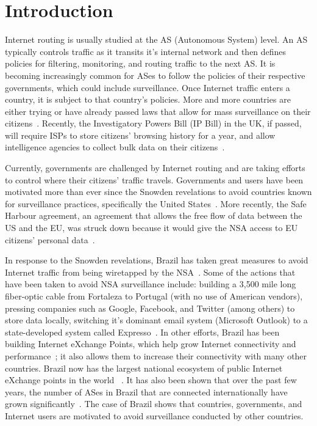 \section{Introduction}
\label{intro}

Internet routing is usually studied at the AS (Autonomous System) level.  An AS typically controls traffic as it transits it's internal network and then defines policies for filtering, monitoring, and routing traffic to the next AS.  It is becoming increasingly common for ASes to follow the policies of their respective governments, which could include surveillance.  Once Internet traffic enters a country, it is subject to that country's policies.  More and more countries are either trying or have already passed laws that allow for mass surveillance on their citizens~\cite{france_surveillance, netherlands_surveillance, kazak_surveillance}.  Recently, the Investigatory Powers Bill (IP Bill) in the UK, if passed, will require ISPs to store citizens' browsing history for a year, and allow intelligence agencies to collect bulk data on their citizens~\cite{uk_bill}.

Currently, governments are challenged by Internet routing and are taking efforts to control where their citizens' traffic travels.  Governments and users have been motivated more than ever since the Snowden revelations to avoid countries known for surveillance practices, specifically the United States~\cite{russia_secure_internet, routing_errors, dte}.  More recently, the Safe Harbour agreement, an agreement that allows the free flow of data between the US and the EU, was struck down because it would give the NSA access to EU citizens' personal data~\cite{safe_harbour_illegal, safe_harbour_undecided}.

In response to the Snowden revelations, Brazil has taken great measures to avoid Internet traffic from being wiretapped by the NSA~\cite{brazil_history, brazil_break_from_US, brazil_conference, brazil_conference2, brazil_human_rights}.  Some of the actions that have been taken to avoid NSA surveillance include: building a 3,500 mile long fiber-optic cable from Fortaleza to Portugal (with no use of American vendors), pressing companies such as Google, Facebook, and Twitter (among others) to store data locally, switching it's dominant email system (Microsoft Outlook) to a state-developed system called Expresso~\cite{brazil_cable, brazil_us_companies}.  In other efforts, Brazil has been building Internet eXchange Points, which help grow Internet connectivity and performance~\cite{brazil_IXP1, brazil_IXP2}; it also allows them to increase their connectivity with many other countries.  Brazil now has the largest national ecosystem of public Internet eXchange points in the world ~\cite{brazil_largest_IXP}.  It has also been shown that over the past few years, the number of ASes in Brazil that are connected internationally have grown significantly~\cite{brazil_international_ases}.  The case of Brazil shows that countries, governments, and Internet users are motivated to avoid surveillance conducted by other countries.

